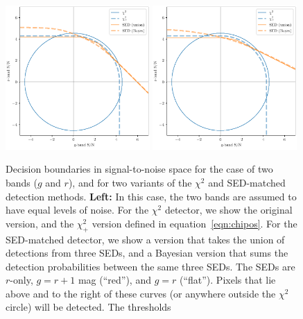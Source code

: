 \documentclass[11pt,letterpaper,linenumbers]{aastex63}
\newcommand{\equationname}{equation}
\newcommand{\eqnref}[1]{\mbox{\equationname~\ref{#1}}}
\newcommand{\chipos}{\chi_+}
\begin{document}
\begin{figure}
  \begin{center}
    \includegraphics[width=0.49\textwidth]{chisq-pos-decision-boundary}%
    \hspace{0.01\textwidth}%
    \includegraphics[width=0.49\textwidth]{chisq-pos-decision-boundary-sens}%
  \end{center}
  \caption{Decision boundaries in signal-to-noise space for the case
    of two bands ($g$ and $r$), and for two variants of the $\chi^2$
    and SED-matched detection methods.  \textbf{Left:} In this case,
    the two bands are assumed to have equal levels of noise.  For the
    $\chi^2$ detector, we show the original version, and the
    $\chipos^2$ version defined in \eqnref{eqn:chipos}.  For the
    SED-matched detector, we show a version that takes the union of
    detections from three SEDs, and a Bayesian version that sums the
    detection probabilities between the same three SEDs.  The SEDs are
    $r$-only, $g = r + 1$ mag (``red''), and $g=r$ (``flat'').  Pixels
    that lie above and to the right of these curves (or anywhere
    outside the $\chi^2$ circle) will be detected.  The thresholds
}
\end{figure}
\end{document}

